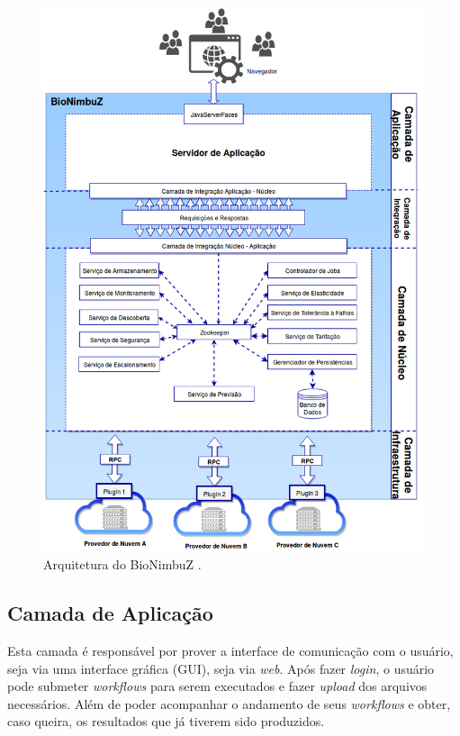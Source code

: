 \begin{figure}[htbp]
	\centerline{\includegraphics[scale=0.45]{img/ArquiteturaBioNimbuZ.png}}
	\caption{Arquitetura do BioNimbuZ \cite{Alves_BioNimbuz}.}
	\label{Arquitetura}
\end{figure}



\subsection{Camada de Aplicação} Esta camada é responsável por prover a interface de comunicação com o usuário, seja via uma interface gráfica (GUI), seja via \textit{web}. Após fazer \textit{login}, o usuário pode submeter \textit{workflows} para serem executados e fazer \textit{upload} dos arquivos necessários. Além de poder acompanhar o andamento de seus \textit{workflows} e obter, caso queira, os resultados que já tiverem sido produzidos.

